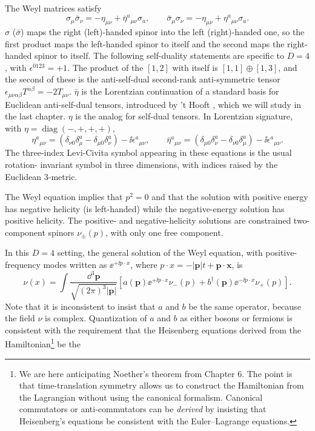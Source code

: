 The Weyl matrices satisfy
\begin{equation*}
  \sigma_\mu\bar\sigma_\nu=-\eta_{\mu\nu}+\bar\eta^a{}_{\mu\nu}\sigma_a,
  \qquad
  \bar\sigma_\mu\sigma_\nu=-\eta_{\mu\nu}+\eta^a{}_{\mu\nu}\sigma_a.
\end{equation*}
$\sigma$ ($\bar\sigma$) maps the right (left)-handed spinor into the left (right)-handed
one, so the first product maps the left-handed spinor to itself and the second maps the right-handed
spinor to itself. The following self-duality statements are specific to $D=4$, with
$\epsilon^{0123}=+1$. The product of the $[1,2]$ with itself is $[1,1]\oplus[1,3]$, and the second of
these is the anti-self-dual second-rank anti-symmetric tensor $\epsilon_{\mu\nu\alpha\beta}T^{\alpha\beta}=-2T_{\mu\nu}$. $\bar\eta$ is
the Lorentzian continuation of a standard basis for Euclidean anti-self-dual tensors,
introduced by ’t Hooft \cite{banks-ref-25}, which we will study in the last chapter. $\eta$ is the analog for
self-dual tensors. In Lorentzian signature, with $\eta=\operatorname{diag}(-,+,+,+)$,
\begin{equation*}
  \eta^a{}_{\mu\nu}=(\delta_{\nu0}\delta^a_\mu-\delta_{\mu0}\delta^a_\nu)-\ii\epsilon^a{}_{\mu\nu},
  \qquad
  \bar\eta^a{}_{\mu\nu}=(\delta_{\mu0}\delta^a_\nu-\delta_{\nu0}\delta^a_\mu)-\ii\epsilon^a{}_{\mu\nu}.
\end{equation*}
The three-index Levi-Civita symbol appearing in these equations is the usual rotation-
invariant symbol in three dimensions, with indices raised by the Euclidean 3-metric.

The Weyl equation implies that $p^2=0$ and that the solution with positive energy
has negative helicity (is left-handed) while the negative-energy solution has positive
helicity. The positive- and negative-helicity solutions are constrained two-component
spinors $\nu_\pm(p)$, with only one free component.

In this $D=4$ setting, the general solution of the Weyl equation, with positive-frequency modes written as
$\ee^{+\ii p\cdot x}$, where $p\cdot x=-|\mathbf p|t+\mathbf p\cdot\mathbf x$, is
\begin{equation*}
  \nu(x)=\int\frac{\dd^3\mathbf p}{\sqrt{(2\pi)^3|\mathbf p|}}
  \left[a(\mathbf p)\ee^{+\ii p\cdot x}\nu_-(p)+b^\dagger(\mathbf p)\ee^{-\ii p\cdot x}\nu_+(p)\right].
\end{equation*}
Note that it is inconsistent to insist that $a$ and $b$ be the same operator, because the field
$\nu$ is complex. Quantization of $a$ and $b$ as either bosons or fermions is consistent with
the requirement that the Heisenberg equations derived from the Hamiltonian\footnote[6]{We are here anticipating Noether’s theorem from Chapter 6. The point is that time-translation symmetry allows us to construct the Hamiltonian from the Lagrangian without using the canonical formalism. Canonical commutators or anti-commutators can be \emph{derived} by insisting that Heisenberg’s equations be consistent with the Euler--Lagrange equations.} be the

